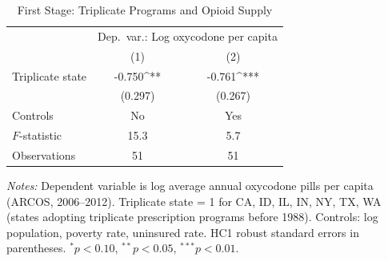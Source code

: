 \begin{table}[t]
\centering
\caption{First Stage: Triplicate Programs and Opioid Supply}
\label{tab:first_stage}
\begin{tabular}{lcc}
\hline\hline
 & \multicolumn{2}{c}{Dep.\ var.: Log oxycodone per capita} \\
 & (1) & (2) \\
\hline
\addlinespace
Triplicate state & -0.750^{**} & -0.761^{***} \\
 & (0.297) & (0.267) \\
\addlinespace
\hline
Controls & No & Yes \\
$F$-statistic & 15.3 & 5.7 \\
Observations & 51 & 51 \\
\hline\hline
\end{tabular}
\begin{tablenotes}
\item \textit{Notes:} Dependent variable is log average annual oxycodone pills per capita (ARCOS, 2006--2012). Triplicate state = 1 for CA, ID, IL, IN, NY, TX, WA (states adopting triplicate prescription programs before 1988). Controls: log population, poverty rate, uninsured rate. HC1 robust standard errors in parentheses. $^{*}p<0.10$, $^{**}p<0.05$, $^{***}p<0.01$.
\end{tablenotes}
\end{table}
